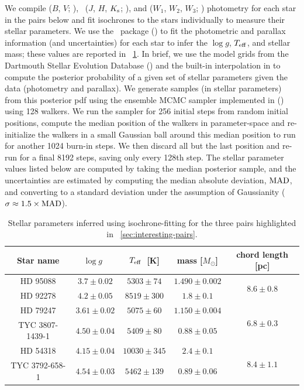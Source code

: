 \documentclass[modern, letterpaper]{aastex61}
\newcommand{\tmass}{\acronym{2MASS}}
\newcommand{\logg}{\ensuremath{\ensuremath{\log g}}}
\newcommand{\teff}{\ensuremath{\ensuremath{T_{\rm eff}}}}
\begin{document}
We compile  ($B$, $V$; \citealt{Hog:2000}), \tmass\
($J$, $H$, $K_{\rm s}$; \citealt{Skrutskie:2006}), and  ($W_1$,
$W_2$, $W_3$; \citealt{Wright:2010}) photometry for each star in the pairs below
and fit isochrones to the stars individually to measure their stellar
parameters.
We use the  \python\ package (\citealt{Morton:2015}) to fit
the photometric and parallax information (and uncertainties) for each star to
infer the \logg, \teff, and stellar mass; these values are reported in
\tablename~\ref{tbl:highlighted-pairs}.
In brief, we use the model grids from the Dartmouth Stellar Evolution Database
(\citealt{Dotter:2008}) and the built-in interpolation in \package{isochrones}
to compute the posterior probability of a given set of stellar parameters given
the data (photometry and parallax).
We generate samples (in stellar parameters) from this posterior pdf using the
ensemble MCMC sampler implemented in \package{emcee}
(\citealt{Foreman-Mackey:2013}) using 128 walkers.
We run the sampler for 256 initial steps from random initial positions, compute
the median position of the walkers in parameter-space and re-initialize the
walkers in a small Gaussian ball around this median position to run for another
1024 burn-in steps.
We then discard all but the last position and re-run for a final 8192 steps,
saving only every 128th step.
The stellar parameter values listed below are computed by taking the median
posterior sample, and the uncertainties are estimated by computing the median
absolute deviation, ${\rm MAD}$, and converting to a standard deviation under
the assumption of Gaussianity ($\sigma \approx 1.5 \times {\rm MAD}$).

\begin{table}[ht]
  \begin{center}
    \begin{tabular}{ c | c | c | c | c }
      \toprule
        Star name & \logg\ & \teff\ [K] & mass [$M_\odot$] &
          chord length [pc]  \\
        \toprule
        HD 95088 & $3.7 \pm 0.02$ & $5303 \pm 74$ & $1.490 \pm 0.002$ &
          \multirow{2}{*}{$8.6 \pm 0.8$}\\
        HD 92278 & $4.2 \pm 0.05$ & $8519 \pm 300$ & $1.8 \pm 0.1$ &\\
        \midrule
        HD 79247 & $3.61 \pm 0.02$ & $5075 \pm 60$ & $1.150 \pm 0.004$ &
          \multirow{2}{*}{$6.8 \pm 0.3$}\\
        TYC 3807-1439-1 & $4.50 \pm 0.04$ & $5409 \pm 80$ & $0.88 \pm 0.05$ &\\
        \midrule
        HD 54318 & $4.15 \pm 0.04$ & $10030 \pm 345$ & $2.4 \pm 0.1$ &
          \multirow{2}{*}{$8.4 \pm 1.1$}\\
        TYC 3792-658-1 & $4.54 \pm 0.03$ & $5462 \pm 139$ & $0.89 \pm 0.06$ &\\
      \bottomrule
    \end{tabular}
    \caption{
      Stellar parameters inferred using isochrone-fitting for the three pairs
      highlighted in \sectionname~\ref{sec:interesting-pairs}.
      \label{tbl:highlighted-pairs}
    }
  \end{center}
\end{table}
\end{document}
